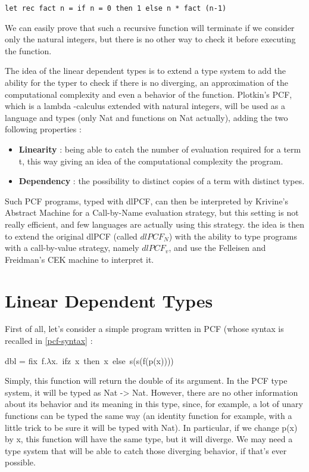 \documentclass[a4paper,12pt]{report}
\begin{document}
\begin{verbatim}
let rec fact n = if n = 0 then 1 else n * fact (n-1)
\end{verbatim}

We can easily prove that such a recursive function will terminate if we consider
only the natural integers, but there is no other way to check it before
executing the function.

The idea of the linear dependent types is to extend a type system to add the
ability for the typer to check if there is no diverging, an approximation of the
computational complexity and even a behavior of the function. Plotkin's PCF,
which is a lambda -calculus extended with natural integers, will be used as a
language and types (only Nat and functions on Nat actually), adding the two
following properties :
\begin{itemize}
\item \textbf{Linearity} : being able to catch the number of evaluation required
  for a term t, this way giving an idea of the computational complexity the
  program.
\item \textbf{Dependency} : the possibility to distinct copies of a term with
  distinct types.
\end{itemize}

Such PCF programs, typed with dlPCF, can then be interpreted by Krivine's
Abstract Machine for a Call-by-Name evaluation strategy, but this setting is not
really efficient, and few languages are actually using this strategy. the idea
is then to extend the original dlPCF (called $ dlPCF_{N} $) with the ability to type
programs with a call-by-value strategy, namely $ dlPCF_{v} $, and use the Felleisen and
Freidman's CEK machine to interpret it.

\section{Linear Dependent Types}

First of all, let's consider a simple program written in PCF (whose syntax is
recalled in \ref{pcf-syntax} :

\begin{center} 
  dbl = fix~f.$\lambda $x.~ifz~x~then~x~else~s(s(f(p(x)))) 
\end{center}

Simply, this function will return the double of its argument. In the PCF type
system, it will be typed as Nat -> Nat. However, there are no other
information about its behavior and its meaning in this type, since, for example,
a lot of unary functions can be typed the same way (an identity function for
example, with a little trick to be sure it will be typed with Nat). In
particular, if we change p(x) by x, this function will have the same type, but
it will diverge. We may need a type system that will be able to catch those
diverging behavior, if that's ever possible.
\end{document}
